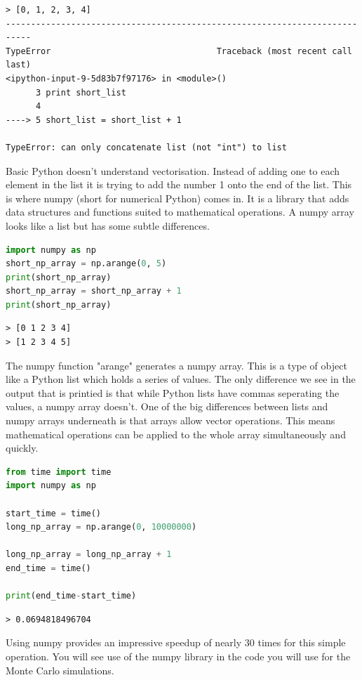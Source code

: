 	\begin{verbatim}
> [0, 1, 2, 3, 4]
---------------------------------------------------------------------------
TypeError                                 Traceback (most recent call last)
<ipython-input-9-5d83b7f97176> in <module>()
      3 print short_list
      4 
----> 5 short_list = short_list + 1

TypeError: can only concatenate list (not "int") to list\end{verbatim}

	Basic Python doesn't understand vectorisation. Instead of adding one to each element in the list it is trying to add the number 1 onto the end of the list. This is where numpy (short for numerical Python) comes in. It is a library that adds data structures and functions suited to mathematical operations. A numpy array looks like a list but has some subtle differences.

	\begin{lstlisting}[language=Python]
import numpy as np
short_np_array = np.arange(0, 5)
print(short_np_array)
short_np_array = short_np_array + 1
print(short_np_array)\end{lstlisting}

	\begin{verbatim}
> [0 1 2 3 4]
> [1 2 3 4 5]
	\end{verbatim}

	The numpy function "arange" generates a numpy array. This is a type of object like a Python list which holds a series of values. The only difference we see in the output that is printied is that while Python lists have commas seperating the values, a numpy array doesn't. One of the big differences between lists and numpy arrays underneath is that arrays allow vector operations. This means mathematical operations can be applied to the whole array simultaneously and quickly.

	\begin{lstlisting}[language=Python]
from time import time
import numpy as np

start_time = time()
long_np_array = np.arange(0, 10000000)

long_np_array = long_np_array + 1
end_time = time()

print(end_time-start_time)\end{lstlisting}
	\begin{verbatim}
> 0.0694818496704 \end{verbatim}

	Using numpy provides an impressive speedup of nearly 30 times for this simple operation. You will see use of the numpy library in the code you will use for the Monte Carlo simulations.

